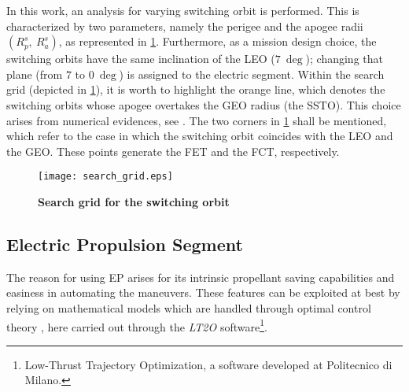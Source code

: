In this work, an analysis for varying switching orbit is performed. This is characterized by two parameters, namely the perigee and the apogee radii $(R_p^s,~R_a^s)$, as represented in \figurename\ref{fig:searchgrid}.
Furthermore, as a mission design choice, the switching orbits have the same inclination of the LEO ($7~\si{\deg}$); changing that plane (from $7$ to $0~\si{\deg}$) is assigned to the electric segment.
Within the search grid (depicted in \figurename\ref{fig:searchgrid}), it is worth to highlight the orange line, which denotes the switching orbits whose apogee overtakes the GEO radius (the SSTO). This choice arises from numerical evidences, see \cite{tesiluca,goebel2002performance}.
The two corners in \figurename\ref{fig:searchgrid} shall be mentioned, which refer to the case in which the switching orbit coincides with the LEO and the GEO. These points generate the FET and the FCT, respectively. 
%
\begin{figure}[htp]
\centering
\texttt{[image: search\_grid.eps]}
\caption{\textbf{Search grid for the switching orbit}}
\label{fig:searchgrid}
\end{figure}
%
\subsection{Electric Propulsion Segment}
\label{subsec:electricsegment}
The reason for using EP arises for its intrinsic propellant saving capabilities and easiness in automating the maneuvers. These features can be exploited at best by relying on mathematical models which are handled through optimal control theory \cite{bryson1975applied}, here carried out through the \emph{LT2O} software\footnote{Low-Thrust Trajectory Optimization, a software developed at Politecnico di Milano.}.
%
